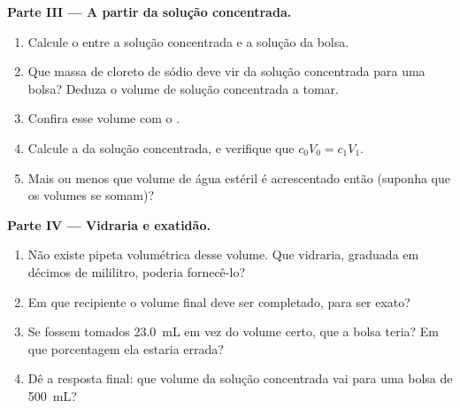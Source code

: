 \begin{problem}
\medskip
\noindent\textbf{Parte III --- A partir da solução concentrada.}
\begin{enumerate}[resume]
  \item Calcule o  entre a solução concentrada e a
        solução da bolsa.
  \item Que massa de cloreto de sódio deve vir da solução concentrada
        para uma bolsa? Deduza o volume de solução concentrada a tomar.
  \item Confira esse volume com o .
  \item Calcule a  da solução concentrada, e
        verifique que $c_0 V_0 = c_1 V_1$.
  \item Mais ou menos que volume de água estéril é acrescentado então
        (suponha que os volumes se somam)?
\end{enumerate}

\medskip
\noindent\textbf{Parte IV --- Vidraria e exatidão.}
\begin{enumerate}[resume]
  \item Não existe pipeta volumétrica desse volume. Que vidraria,
        graduada em décimos de mililitro, poderia fornecê-lo?
  \item Em que recipiente o volume final deve ser completado, para ser
        exato?
  \item Se fossem tomados \qty{23.0}{mL} em vez do volume certo, que
         a bolsa teria? Em que porcentagem ela
        estaria errada?
  \item Dê a resposta final: que volume da solução concentrada vai para
        uma bolsa de \qty{500}{mL}?
\end{enumerate}
\end{problem}

